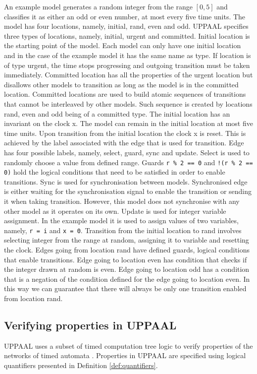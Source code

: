 An example model generates a random integer from the range $[0, 5]$ and classifies it as either an odd or even number, at most every five time units. The model has four locations, namely, initial, rand, even and odd. UPPAAL specifies three types of locations, namely, initial, urgent and committed. Initial location is the starting point of the model. Each model can only have one initial location and in the case of the example model it has the same name as type. If location is of type urgent, the time stops progressing and outgoing transition must be taken immediately. Committed location has all the properties of the urgent location but disallows other models to transition as long as the model is in the committed location. Committed locations are used to build atomic sequences of transitions that cannot be interleaved by other models. Such sequence is created by locations rand, even and odd being of a committed type. The initial location has an invariant on the clock x. The model can remain in the initial location at most five time units. Upon transition from the initial location the clock x is reset. This is achieved by the label associated with the edge that is used for transition. Edge has four possible labels, namely, select, guard, sync and update. Select is used to randomly choose a value from defined range. Guards \texttt{r \% 2 == 0} and \texttt{!(r \% 2 == 0)} hold the logical conditions that need to be satisfied in order to enable transitions. Sync is used for synchronisation between models. Synchronised edge is either waiting for the synchronisation signal to enable the transition or sending it when taking transition. However, this model does not synchronise with any other model as it operates on its own. Update is used for integer variable assignment. In the example model it is used to assign values of two variables, namely, \texttt{r = i} and \texttt{x = 0}.  Transition from the initial location to rand involves selecting integer from the range at random, assigning it to variable and resetting the clock. Edges going from location rand have defined guards, logical conditions that enable transitions. Edge going to location even has condition that checks if the integer drawn at random is even. Edge going to location odd has a condition that is a negation of the condition defined for the edge going to location even. In this way we can guarantee that there will always be only one transition enabled from location rand.

\subsection{Verifying properties in UPPAAL}
UPPAAL uses a subset of timed computation tree logic \cite{Timed_Automata_Semantics_Algorithms_and_Tools} to verify properties of the networks of timed automata .
Properties in UPPAAL are specified using logical quantifiers presented in Definition \ref{def:quantifiers}.

